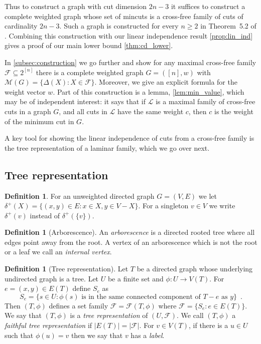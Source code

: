 \documentclass[10pt,a4paper]{article}
\newcommand{\Lcal}{\mathcal{L}}
\newcommand{\M}{\mathcal{M}}
\newcommand{\Fcal}{\mathcal{F}}
\newcommand{\1}{\mathbf{1}}
\theoremstyle{definition}
\newtheorem{definition}[theorem]{Definition}
\begin{document}
Thus to construct a graph with cut dimension $2n-3$ it suffices to construct a complete weighted graph whose set of mincuts
is a cross-free family of cuts of cardinality $2n-3$.  Such a graph is constructed for every $n \ge 2$ in Theorem~5.2 of \cite{CR04}.
Combining this construction with our linear independence result \cref{prop:lin_ind} gives a proof of our main lower bound \cref{thm:cd_lower}.


In \cref{subsec:construction} we go further and show for any maximal cross-free family $\Fcal \subseteq 2^{[n]}$ there is a complete weighted graph $G = ([n],w)$
with $\M(G) = \{ \Delta(X) : X \in \Fcal\}$.  Moreover, we give an explicit formula for the weight vector $w$.
Part of this construction is a lemma, \cref{lem:min_value},
which may be of independent interest: it says that if $\Lcal$ is a maximal family of cross-free cuts in a graph $G$, and all cuts in $\Lcal$ have the same weight $c$, then $c$
is the weight of the minimum cut in $G$.

A key tool for showing the linear independence of cuts from a cross-free family is the tree representation of a laminar family, which we go over next.

\subsection{Tree representation}
\begin{definition}
For an unweighted directed graph $G=(V,E)$ we let $\delta^+(X) = \{(x,y) \in E : x \in X, y \in V - X\}$.  For a singleton $v \in V$
we write $\delta^+(v)$ instead of $\delta^+(\{v\})$.
\end{definition}

\begin{definition}[Arborescence]
An \emph{arborescence} is a directed rooted tree where all edges point away from the root.  A vertex of an arborescence which is
not the root or a leaf we call an \emph{internal vertex}.
\end{definition}

\begin{definition}[Tree representation]\label{def:tree-repre}
Let $T$ be a directed graph whose underlying undirected graph is a tree.  Let $U$ be a finite set and $\phi: U \rightarrow V(T)$.
For $e = (x,y) \in E(T)$ define $S_e$ as
\[
S_e = \{ s \in U : \phi(s) \mbox{ is in the same connected component of } T - e \mbox{ as } y \} \enspace .
\]
Then $(T,\phi)$ defines a set family $\Fcal = \Fcal(T, \phi)$ where $\Fcal = \{S_e : e \in E(T)\}$.
We say that $(T,\phi)$ is a \emph{tree representation} of $(U, \Fcal)$.
We call $(T,\phi)$ a \emph{faithful tree representation} if $|E(T)| = |\Fcal|$.
For $v \in V(T)$, if there is a $u \in U$ such that $\phi(u) = v$ then we say that $v$ has a \emph{label}.
\end{definition}
\end{document}
